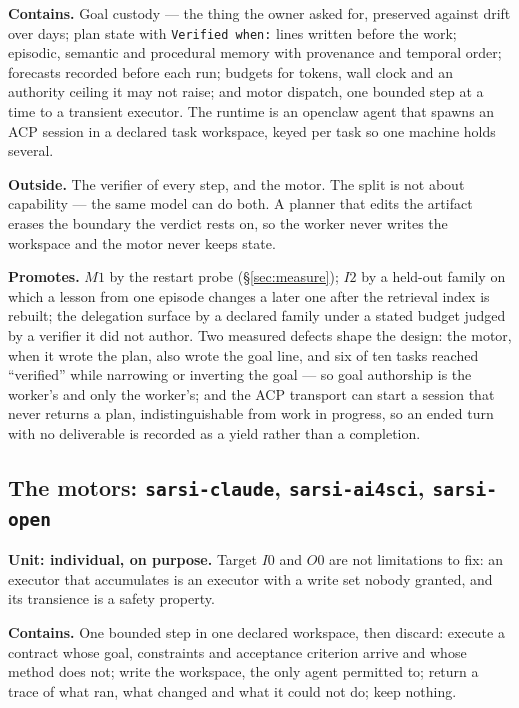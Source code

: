 \documentclass[11pt]{article}
\theoremstyle{definition}
\begin{document}
\textbf{Contains.} Goal custody --- the thing the owner asked for, preserved against drift over days; plan state with \texttt{Verified when:} lines written before the work; episodic, semantic and procedural memory with provenance and temporal order; forecasts recorded before each run; budgets for tokens, wall clock and an authority ceiling it may not raise; and motor dispatch, one bounded step at a time to a transient executor. The runtime is an openclaw agent that spawns an ACP session in a declared task workspace, keyed per task so one machine holds several.

\textbf{Outside.} The verifier of every step, and the motor. The split is not about capability --- the same model can do both. A planner that edits the artifact erases the boundary the verdict rests on, so the worker never writes the workspace and the motor never keeps state.

\textbf{Promotes.} $M1$ by the restart probe (\S\ref{sec:measure}); $I2$ by a held-out family on which a lesson from one episode changes a later one after the retrieval index is rebuilt; the delegation surface by a declared family under a stated budget judged by a verifier it did not author. Two measured defects shape the design: the motor, when it wrote the plan, also wrote the goal line, and six of ten tasks reached ``verified'' while narrowing or inverting the goal --- so goal authorship is the worker's and only the worker's; and the ACP transport can start a session that never returns a plan, indistinguishable from work in progress, so an ended turn with no deliverable is recorded as a yield rather than a completion.

\subsection{The motors: \texttt{sarsi-claude}, \texttt{sarsi-ai4sci}, \texttt{sarsi-open}}\label{sec:motoragents}

\textbf{Unit: individual, on purpose.} Target $I0$ and $O0$ are not limitations to fix: an executor that accumulates is an executor with a write set nobody granted, and its transience is a safety property.

\textbf{Contains.} One bounded step in one declared workspace, then discard: execute a contract whose goal, constraints and acceptance criterion arrive and whose method does not; write the workspace, the only agent permitted to; return a trace of what ran, what changed and what it could not do; keep nothing.
\end{document}

